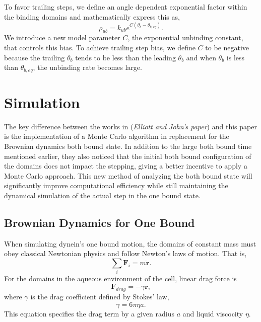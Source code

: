 To favor trailing steps, we define an angle dependent exponential factor within the binding domains and mathematically express this as,
\begin{equation}
	\rho_{ub}=k_{ub}e^{C(\theta_b-\theta_{b,eq})}.
\end{equation}
We introduce a new model parameter $C$, the exponential unbinding constant, that controls this bias. To achieve trailing step bias, we define $C$ to be negative because the trailing $\theta_b$ tends to be less than the leading $\theta_b$ and  when $\theta_b$ is less than $\theta_{b,eq}$, the unbinding rate becomes large.


\section{Simulation}

The key difference between the works in \cite{Capek2017, } (\textit{Elliott and John's paper}) and this paper is the implementation of a Monte Carlo algorithm in replacement for the Brownian dynamics both bound state. In addition to the large both bound time mentioned earlier, they also noticed that the initial both bound configuration of the domains does not impact the stepping, giving a better incentive to apply a Monte Carlo approach. This new method of analyzing the both bound state will significantly improve computational efficiency while still maintaining the dynamical simulation of the actual step in the one bound state. 



\subsection{Brownian Dynamics for One Bound}
\label{sec:BrownianDynamics}

When simulating dynein's one bound motion, the domains of constant mass must obey classical Newtonian physics and follow Newton's laws of motion. That is,
\begin{equation}
	\sum_{i}\textbf{F}_i=m\ddot{\textbf{r}}.
\end{equation} 
For the domains in the aqueous environment of the cell, linear drag force is
\begin{equation}
	\textbf{F}_{drag}=-\gamma \dot{\textbf{r}},
\end{equation}
where $\gamma$ is the drag coefficient defined by Stokes' law,
\begin{equation}
	\gamma=6\pi\eta a.
\end{equation}
This equation specifies the drag term by a given radius $a$ and liquid viscocity $\eta$. 

